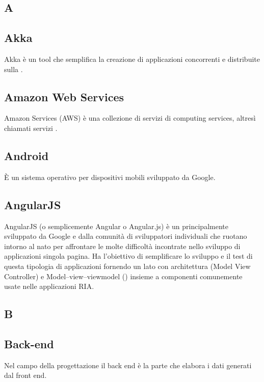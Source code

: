 \newpage

\begin{center}
\Huge\section{\uppercase{A}}
\end{center}

\subsection{Akka}
Akka è un tool  che semplifica la creazione di applicazioni concorrenti e distribuite sulla .

\subsection{Amazon Web Services}
Amazon  Services (AWS) è una collezione di servizi di  computing services, altresì chiamati servizi .

\subsection{Android}
È un sistema operativo  per dispositivi mobili sviluppato da Google.

\subsection{AngularJS}
AngularJS (o semplicemente Angular o Angular.js) è un    principalmente sviluppato da Google e dalla comunità di sviluppatori individuali che ruotano intorno al  nato per affrontare le molte difficoltà incontrate nello sviluppo di applicazioni singola pagina. Ha l'obiettivo di semplificare lo sviluppo e il test di questa tipologia di applicazioni fornendo un  lato  con architettura  (Model View Controller) e Model–view–viewmodel () insieme a componenti comunemente usate nelle applicazioni RIA.

\newpage

\begin{center}
\Huge\section{\uppercase{B}}
\end{center}

\subsection{Back-end}
Nel campo della progettazione  il back end è la parte che elabora i dati generati dal front end.

